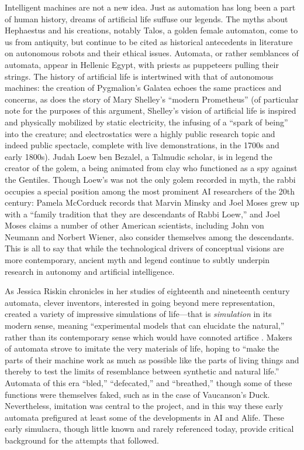 Intelligent machines are not a new idea. Just as automation has long
been a part of human history, dreams of artificial life suffuse our
legends. The myths about Hephaestus and
his creations, notably Talos, a golden female automaton, come to us
from antiquity,\cite[Ch. 1]{mccorduck}  but continue to be cited as historical antecedents in
literature on autonomous robots and their ethical issues.\cite[p. 3]{patricklin} Automata,
or rather semblances of automata, appear in Hellenic Egypt, with
priests as puppeteers pulling their strings.\cite[Ch. 1]{mccorduck} The history of
artificial life is intertwined with that of autonomous machines: the
creation of Pygmalion's Galatea echoes the same practices and
concerns, as does the story of Mary Shelley's ``modern Prometheus'' (of
particular note for the purposes of this argument, Shelley's vision of
artificial life is inspired and physically mobilized by static
electricity, the infusing of a ``spark of being'' into the creature; and
electrostatics were a highly public research topic and indeed public
spectacle, complete with live demonstrations, in the 1700s and early
1800s).\cite[p. 44]{shelley} Judah Loew ben Bezalel, a Talmudic scholar, is in legend the
creator of the golem, a being animated from clay who functioned as a
spy against the Gentiles.\cite[Ch. 1]{mccorduck} Though Loew's was not the only golem
recorded in myth, the rabbi occupies a special position among the most
prominent AI researchers of the 20th century: Pamela McCorduck records
that Marvin Minsky and Joel Moses grew up with a ``family tradition
that they are descendants of Rabbi Loew,'' and Joel Moses claims a number of
other American scientists, including John von Neumann and Norbert
Wiener, also consider themselves among the descendants.\cite[Ch. 1]{mccorduck} This is all
to say that while the technological drivers of conceptual visions are
more contemporary, ancient myth and legend continue to subtly underpin
research in autonomy and artificial intelligence.

As Jessica Riskin chronicles in her studies of eighteenth and
nineteenth century automata, clever inventors, interested in going
beyond mere representation, created a variety of impressive
simulations of life---that is \emph{simulation} in its modern sense, meaning
``experimental models that can elucidate the natural,'' rather than its
contemporary sense which would have connoted artifice \cite[p. 605--606]{riskinDuck}.
Makers of automata strove to imitate the very materials of life,
hoping to ``make the parts of their machine work as much as possible
like the parts of living things and thereby to test the limits of
resemblance between synthetic and natural life.''\cite[p. 606]{riskinDuck}
Automata of this era ``bled,'' ``defecated,'' and ``breathed,'' though some
of these functions were themselves faked, such as in the case of
Vaucanson's Duck. Nevertheless, imitation was central to the project,
and in this way these early automata prefigured at least some of the
developments in AI and Alife. These early simulacra, though little known and
rarely referenced today, provide critical background for the attempts
that followed. 

